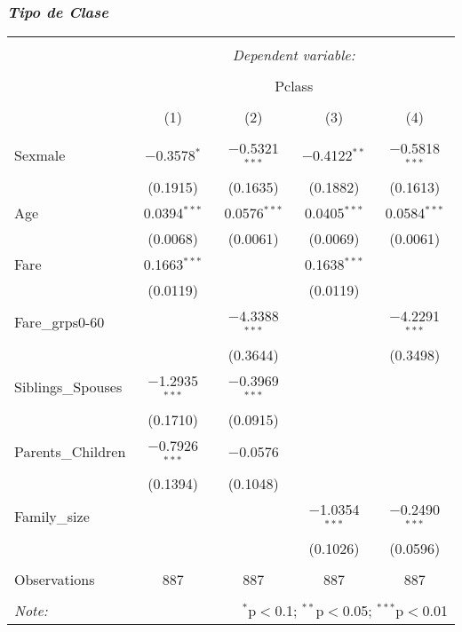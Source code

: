 \documentclass[
]{article}
\begin{document}
\hypertarget{tipo-de-clase}{%
\subsubsection{\texorpdfstring{\emph{Tipo de
Clase}}{Tipo de Clase}}\label{tipo-de-clase}}

\begingroup 
\scriptsize 
\begin{tabular}{@{\extracolsep{5pt}}lcccc} 
\\[-1.8ex]\hline 
\hline \\[-1.8ex] 
 & \multicolumn{4}{c}{\textit{Dependent variable:}} \\ 
\cline{2-5} 
\\[-1.8ex] & \multicolumn{4}{c}{Pclass} \\ 
\\[-1.8ex] & (1) & (2) & (3) & (4)\\ 
\hline \\[-1.8ex] 
 Sexmale & $-$0.3578$^{*}$ & $-$0.5321$^{***}$ & $-$0.4122$^{**}$ & $-$0.5818$^{***}$ \\ 
  & (0.1915) & (0.1635) & (0.1882) & (0.1613) \\ 
  Age & 0.0394$^{***}$ & 0.0576$^{***}$ & 0.0405$^{***}$ & 0.0584$^{***}$ \\ 
  & (0.0068) & (0.0061) & (0.0069) & (0.0061) \\ 
  Fare & 0.1663$^{***}$ &  & 0.1638$^{***}$ &  \\ 
  & (0.0119) &  & (0.0119) &  \\ 
  Fare\_grps0-60 &  & $-$4.3388$^{***}$ &  & $-$4.2291$^{***}$ \\ 
  &  & (0.3644) &  & (0.3498) \\ 
  Siblings\_Spouses & $-$1.2935$^{***}$ & $-$0.3969$^{***}$ &  &  \\ 
  & (0.1710) & (0.0915) &  &  \\ 
  Parents\_Children & $-$0.7926$^{***}$ & $-$0.0576 &  &  \\ 
  & (0.1394) & (0.1048) &  &  \\ 
  Family\_size &  &  & $-$1.0354$^{***}$ & $-$0.2490$^{***}$ \\ 
  &  &  & (0.1026) & (0.0596) \\ 
 \hline \\[-1.8ex] 
Observations & 887 & 887 & 887 & 887 \\ 
\hline 
\hline \\[-1.8ex] 
\textit{Note:}  & \multicolumn{4}{r}{$^{*}$p$<$0.1; $^{**}$p$<$0.05; $^{***}$p$<$0.01} \\ 
\end{tabular} 
\endgroup
\end{document}
